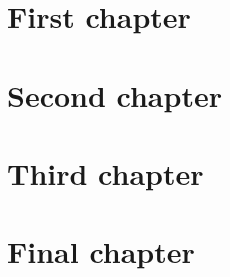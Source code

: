 \documentclass{book}
\begin{document}
\chapter{First chapter} \lipsum[1-10]
\chapter{Second chapter} \lipsum[11-20]
\chapter{Third chapter} \lipsum[21-30]
\chapter{Final chapter} \lipsum[31-40]
\end{document}
